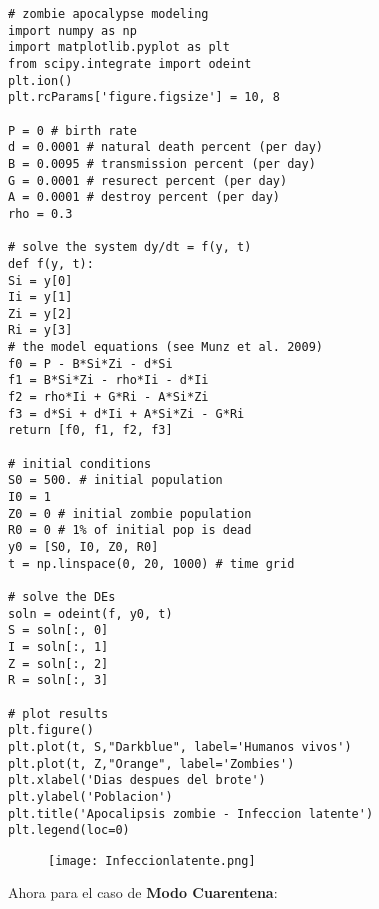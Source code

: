 \documentclass[a4 paper]{article}
\numberwithin{equation}{section}
\newcommand{\0}{\mathbf{0}}
\begin{document}
\begin{verbatim}
# zombie apocalypse modeling
import numpy as np
import matplotlib.pyplot as plt
from scipy.integrate import odeint
plt.ion()
plt.rcParams['figure.figsize'] = 10, 8

P = 0 # birth rate
d = 0.0001 # natural death percent (per day)
B = 0.0095 # transmission percent (per day)
G = 0.0001 # resurect percent (per day)
A = 0.0001 # destroy percent (per day)
rho = 0.3

# solve the system dy/dt = f(y, t)
def f(y, t):
Si = y[0]
Ii = y[1]
Zi = y[2]
Ri = y[3]
# the model equations (see Munz et al. 2009)
f0 = P - B*Si*Zi - d*Si
f1 = B*Si*Zi - rho*Ii - d*Ii
f2 = rho*Ii + G*Ri - A*Si*Zi
f3 = d*Si + d*Ii + A*Si*Zi - G*Ri
return [f0, f1, f2, f3]

# initial conditions
S0 = 500. # initial population
I0 = 1
Z0 = 0 # initial zombie population
R0 = 0 # 1% of initial pop is dead
y0 = [S0, I0, Z0, R0]
t = np.linspace(0, 20, 1000) # time grid

# solve the DEs
soln = odeint(f, y0, t)
S = soln[:, 0]
I = soln[:, 1]
Z = soln[:, 2]
R = soln[:, 3]

# plot results
plt.figure()
plt.plot(t, S,"Darkblue", label='Humanos vivos')
plt.plot(t, Z,"Orange", label='Zombies')
plt.xlabel('Dias despues del brote')
plt.ylabel('Poblacion')
plt.title('Apocalipsis zombie - Infeccion latente')
plt.legend(loc=0)
\end{verbatim}

\begin{figure}[!ht]
  \centering
      \texttt{[image: Infeccionlatente.png]}
  \caption{}
\end{figure}

Ahora para el caso de {\bf Modo Cuarentena}:
\end{document}
